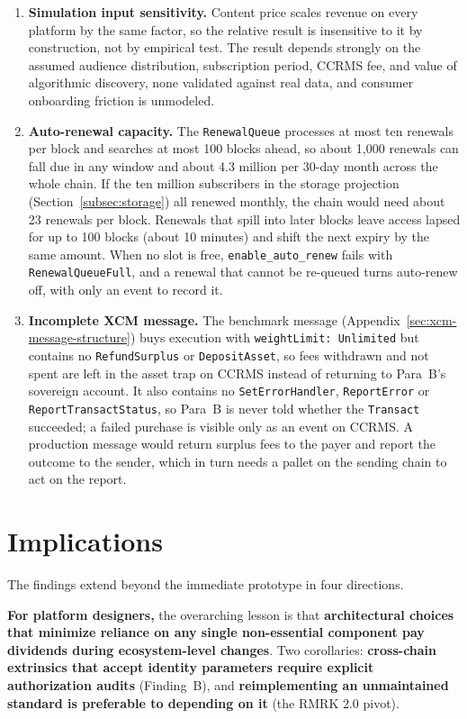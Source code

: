 \begin{enumerate}
\item \textbf{Simulation input sensitivity.} Content price scales revenue on every platform by the same factor, so the relative result is insensitive to it by construction, not by empirical test. The result depends strongly on the assumed audience distribution, subscription period, CCRMS fee, and value of algorithmic discovery, none validated against real data, and consumer onboarding friction is unmodeled.
\item \textbf{Auto-renewal capacity.} The \texttt{RenewalQueue} processes at most ten renewals per block and searches at most 100 blocks ahead, so about 1,000 renewals can fall due in any window and about 4.3 million per 30-day month across the whole chain. If the ten million subscribers in the storage projection (Section~\ref{subsec:storage}) all renewed monthly, the chain would need about 23 renewals per block. Renewals that spill into later blocks leave access lapsed for up to 100 blocks (about 10 minutes) and shift the next expiry by the same amount. When no slot is free, \texttt{enable\_auto\_renew} fails with \texttt{RenewalQueueFull}, and a renewal that cannot be re-queued turns auto-renew off, with only an event to record it.
\item \textbf{Incomplete XCM message.} The benchmark message (Appendix~\ref{sec:xcm-message-structure}) buys execution with \texttt{weightLimit: Unlimited} but contains no \texttt{RefundSurplus} or \texttt{DepositAsset}, so fees withdrawn and not spent are left in the asset trap on CCRMS instead of returning to Para~B's sovereign account. It also contains no \texttt{SetErrorHandler}, \texttt{ReportError} or \texttt{ReportTransactStatus}, so Para~B is never told whether the \texttt{Transact} succeeded; a failed purchase is visible only as an event on CCRMS. A production message would return surplus fees to the payer and report the outcome to the sender, which in turn needs a pallet on the sending chain to act on the report.
\end{enumerate}

\section{Implications}\label{sec:implications}

The findings extend beyond the immediate prototype in four directions.

\textbf{For platform designers,} the overarching lesson is that \textbf{architectural choices that minimize reliance on any single non-essential component pay dividends during ecosystem-level changes}. Two corollaries: \textbf{cross-chain extrinsics that accept identity parameters require explicit authorization audits} (Finding~B), and \textbf{reimplementing an unmaintained standard is preferable to depending on it} (the RMRK 2.0 pivot).

